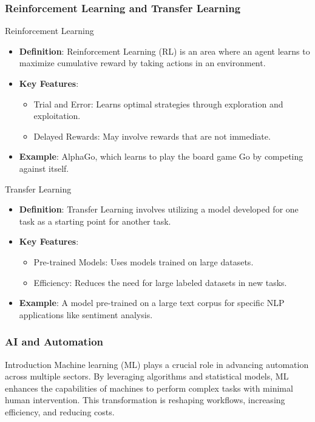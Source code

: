 \documentclass{beamer}
\begin{document}
\begin{frame}[fragile]
    \frametitle{Reinforcement Learning and Transfer Learning}
    \begin{block}{Reinforcement Learning}
        \begin{itemize}
            \item \textbf{Definition}: Reinforcement Learning (RL) is an area where an agent learns to maximize cumulative reward by taking actions in an environment.
            \item \textbf{Key Features}:
            \begin{itemize}
                \item Trial and Error: Learns optimal strategies through exploration and exploitation.
                \item Delayed Rewards: May involve rewards that are not immediate.
            \end{itemize}
            \item \textbf{Example}: AlphaGo, which learns to play the board game Go by competing against itself.
        \end{itemize}
    \end{block}

    \begin{block}{Transfer Learning}
        \begin{itemize}
            \item \textbf{Definition}: Transfer Learning involves utilizing a model developed for one task as a starting point for another task.
            \item \textbf{Key Features}:
            \begin{itemize}
                \item Pre-trained Models: Uses models trained on large datasets.
                \item Efficiency: Reduces the need for large labeled datasets in new tasks.
            \end{itemize}
            \item \textbf{Example}: A model pre-trained on a large text corpus for specific NLP applications like sentiment analysis.
        \end{itemize}
    \end{block}
\end{frame}

\begin{frame}[fragile]
    \frametitle{AI and Automation}
    \begin{block}{Introduction}
        Machine learning (ML) plays a crucial role in advancing automation across multiple sectors. By leveraging algorithms and statistical models, ML enhances the capabilities of machines to perform complex tasks with minimal human intervention. This transformation is reshaping workflows, increasing efficiency, and reducing costs.
    \end{block}
\end{frame}
\end{document}
